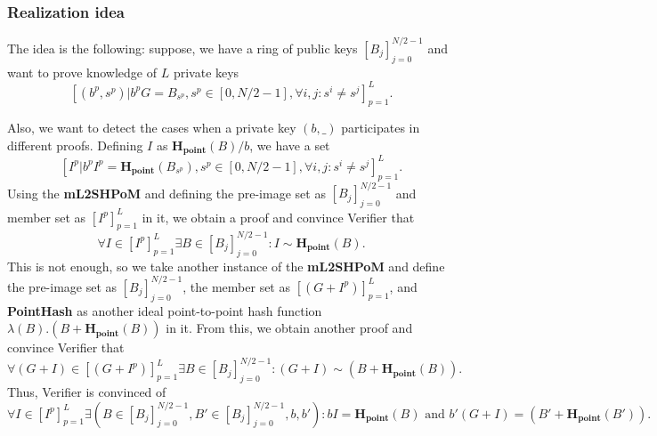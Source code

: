 \documentclass{mathcryptology} %
\newcommand{\Hpoint}{\textbf{H}_{\textbf{point}}}
\theoremstyle{title}
\theoremstyle{titleof}
\begin{document}
\subsubsection{Realization idea}
    The idea is the following: suppose, we have a ring of public keys ${\left[B_{j}\right]}_{j=0}^{N/2-1}$ and want to prove knowledge of $L$ private keys
    \begin{equation*}
        {\left[\left(b^{p}, s^{p}\right) | b^{p} G = B_{s^p}, s^{p}\in \left[0,N/2-1\right], \forall i,j: s^{i}\neq s^{j} \right]}_{p=1}^{L}.
    \end{equation*}

    Also, we want to detect the cases when a private key $\left(b,\_\right)$ participates in different proofs. Defining $I$ as $\Hpoint \left(B\right)/b$, we have a set
    \begin{equation*}
        {\left[I^{p} | b^{p} I^{p} = \Hpoint
        \left(B_{s^p}\right), s^{p} \in \left[0,N/2-1\right], \forall i,j: s^{i}\neq s^{j} \right]}_{p=1}^{L}.
    \end{equation*}
    Using the \textbf{mL2SHPoM} and defining the pre-image set as ${\left[B_{j}\right]}_{j=0}^{N/2-1}$ and member set as ${\left[I^{p}\right]}_{p=1}^{L}$ in it, we obtain a proof and convince Verifier that
    \begin{equation*}
        \forall I\in{\left[I^{p}\right]}_{p=1}^{L} \exists B\in{\left[B_{j}\right]}_{j=0}^{N/2-1}:
        I\sim \Hpoint \left(B\right).
    \end{equation*}
    This is not enough, so we take another instance of the \textbf{mL2SHPoM} and define the pre-image set as ${\left[B_{j}\right]}_{j=0}^{N/2-1}$, the member set as ${\left[\left(G+I^{p}\right)\right]}_{p=1}^{L}$, and \textbf{PointHash} as another ideal point-to-point hash function $\lambda\left(B\right).\left(B+\Hpoint\left(B\right)\right)$ in it. From this, we obtain another proof and convince Verifier that
    \begin{equation*}
        \forall \left(G+I\right)\in {\left[\left(G+I^{p}\right)\right]}_{p=1}^{L} \exists
        B\in {\left[B_{j}\right]}_{j=0}^{N/2-1}: \left(G+I\right)\sim \left(B+\Hpoint \left(B\right)\right).
    \end{equation*}
    Thus, Verifier is convinced of
    \begin{equation*}
        \forall I\in {\left[I^{p}\right]}_{p=1}^{L} \exists \left(
        B\in {\left[B_{j}\right]}_{j=0}^{N/2-1},
        B'\in{\left[B_{j}\right]}_{j=0}^{N/2-1},b,b' \right):
        b I = \Hpoint \left(B\right)
        \text{ and }
        b'\left(G+I\right) = \left(B'+\Hpoint \left(B'\right)\right).
    \end{equation*}
\end{document}
